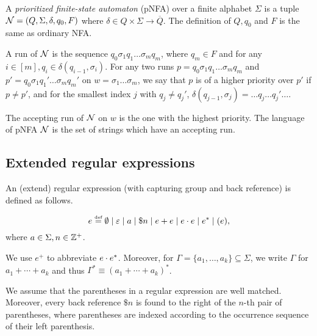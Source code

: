 \begin{definition}
  A \emph{prioritized finite-state automaton} (pNFA) over a finite alphabet $\Sigma$ is a tuple $\mathcal{N}=(Q, \Sigma, \delta, q_0, F)$ where $\delta \in Q
  \times \Sigma \rightarrow \overline{Q}$. The definition of $Q, q_0$ and $F$ is the same as ordinary NFA.
\end{definition}

A run of $\mathcal{N}$ is the sequence $q_0 \sigma_1 q_1 \ldots \sigma_m q_m$, where $q_m \in F$ and for any $i \in [m], q_i \in \delta (q_{i - 1}, \sigma_i)$. For any two runs $p = q_0 \sigma_1 q_1 \ldots \sigma_m q_m$ and $p' =  q_0 \sigma_1 q_1' \ldots \sigma_m q_m'$ on $w = \sigma_1 \ldots \sigma_m$, we say that $p$ is of a higher priority over  $p'$ if $p \neq p'$, and for the smallest index $j$ with $q_j \neq q_j'$, $\delta (q_{j - 1}, \sigma_j) = \ldots q_j \ldots q_j' \ldots$.
  
  The accepting run of $\mathcal{N}$ on $w$ is the one with the highest priority. The language of pNFA $\mathcal{N}$ is the set of
  strings which have an accepting run.
  
 \subsection{Extended regular expressions}
An (extend) regular expression (with capturing group and back reference) is defined as follows.
  
\begin{definition}
  	\[e \eqdef \emptyset \mid \varepsilon \mid a \mid \$n \mid e + e \mid e \concat e \mid e^* \mid (e)  , \]
  	where $a \in \Sigma, n \in \mathbb{Z}^+$. 
\end{definition}
  	
We use $e^+$ to abbreviate $e \cdot e^*$. Moreover, for $\Gamma = \{a_1, \ldots, a_k\}\subseteq \Sigma$, we write $\Gamma$ for  $a_1 + \cdots + a_k$ and thus  $\Gamma^\ast \equiv (a_1 + \cdots + a_k)^\ast$. 

We assume that the parentheses in a regular expression are well matched. 
%
Moreover, every back reference $\$ n$ is found to the right of the $n$-th pair of parentheses, where parentheses
are indexed according to the occurrence sequence of their left parenthesis.
  
